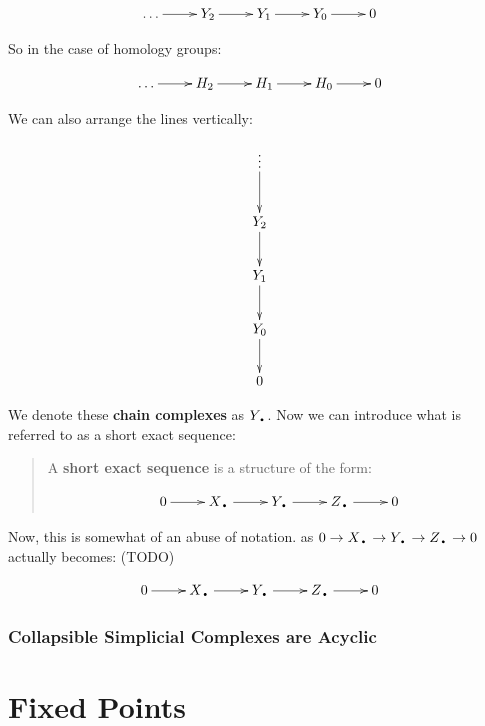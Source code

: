 \documentclass[letterpaper,12pt]{article}
\newcommand{\tb}{\text{\textbullet}}
\begin{document}
\begin{displaymath}
    \xymatrix{\ldots \ar[r] & Y_2 \ar[r] & Y_1 \ar[r] & Y_0 \ar[r] & 0 }
\end{displaymath}

So in the case of homology groups:

\begin{displaymath}
    \xymatrix{\ldots \ar[r] & H_2 \ar[r] & H_1 \ar[r] & H_0 \ar[r] & 0 }
\end{displaymath}

We can also arrange the lines vertically:

\begin{displaymath}
    \xymatrix{\vdots \ar[d] \\ Y_2 \ar[d] \\ Y_1 \ar[d] \\ Y_0 \ar[d] \\ 0 }
\end{displaymath}

We denote these \textbf{chain complexes} as $Y_{\tb}$. Now we can introduce what is referred to as a short exact sequence:

\begin{quote}
    A \textbf{short exact sequence} is a structure of the form:

    \begin{displaymath}
        \xymatrix{0 \ar[r] & X_{\tb} \ar[r] & Y_{\tb} \ar[r] & Z_{\tb} \ar[r] & 0 }
    \end{displaymath}

\end{quote}

Now, this is somewhat of an abuse of notation. as $0 \rightarrow X_{\tb} \rightarrow Y_{\tb} \rightarrow Z_{\tb} \rightarrow 0$ actually becomes: (TODO)

\begin{displaymath}
    \xymatrix{0 \ar[r] & X_{\tb} \ar[r] & Y_{\tb} \ar[r] & Z_{\tb} \ar[r] & 0 }
\end{displaymath}


\subsubsection{Collapsible Simplicial Complexes are Acyclic}

\section{Fixed Points}
\end{document}

